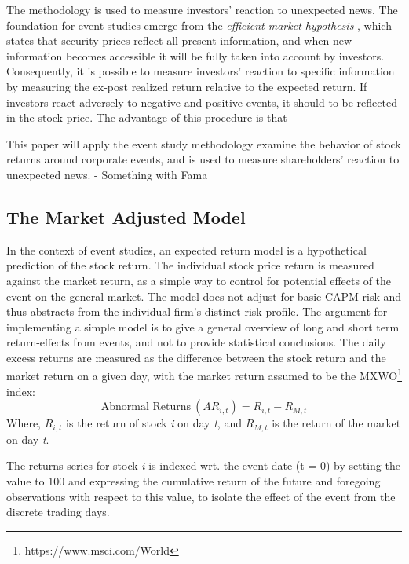The methodology is used to measure investors' reaction to unexpected news. The foundation for event studies emerge from the \textit{efficient market hypothesis} \citep{fama1969_EMH}, which states that security prices reflect all present information, and when new information becomes accessible it will be fully taken into account by investors. Consequently, it is possible to measure investors' reaction to specific information by measuring the ex-post realized return relative to the expected return. If investors react adversely to negative and positive events, it should to be reflected in the stock price. The advantage of this procedure is that 


This paper will apply the event study methodology examine the behavior of stock returns around corporate events, and is used to measure shareholders' reaction to unexpected news. 
- Something with Fama


\subsection{The Market Adjusted Model}

In the context of event studies, an expected return model is a hypothetical prediction of the stock return. The individual stock price return is measured against the market return, as a simple way to control for potential effects of the event on the general market. The model does not adjust for basic CAPM risk and thus abstracts from the individual firm's distinct risk profile. The argument for implementing a simple model is to give a general overview of long and short term return-effects from events, and not to provide statistical conclusions. 
The daily excess returns are measured as the difference between the stock return and the market return on a given day, with the market return assumed to be the MXWO\footnote{https://www.msci.com/World} index:
\begin{equation}
    \text{Abnormal Returns} \:  (AR_{i,t}) = R_{i,t} - R_{M,t} 
\end{equation}
Where, $R_{i,t}$ is the return of stock \textit{i} on day \textit{t}, and $R_{M,t}$ is the return of the market on day \textit{t}. 

The returns series for stock \textit{i} is indexed wrt. the event date (t = 0) by setting the value to 100 and expressing the cumulative return of the future and foregoing observations with respect to this value, to isolate the effect of the event from the discrete trading days. 

